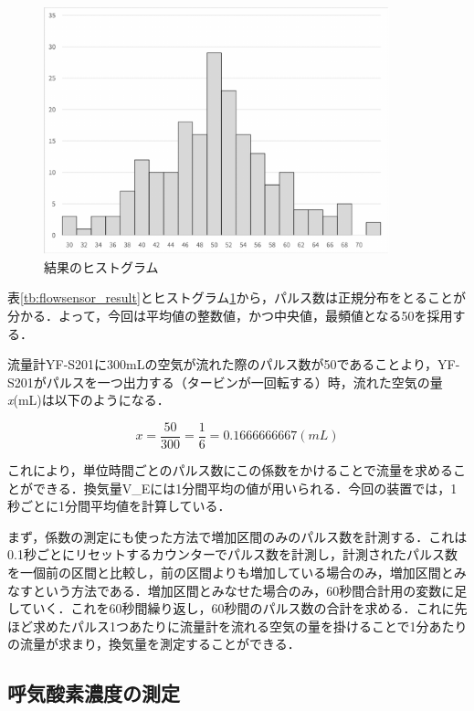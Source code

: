 \begin{figure}[H]
  \begin{center}
    \caption{結果のヒストグラム}
    \label{fig:flowsensor_histogram}
    \includegraphics[width=10cm]{fig/flowsensor_histogram}
  \end{center}
\end{figure}

表\ref{tb:flowsensor_result}とヒストグラム\ref{fig:flowsensor_histogram}から，パルス数は正規分布をとることが分かる．よって，今回は平均値の整数値，かつ中央値，最頻値となる50を採用する．

流量計YF-S201に300mLの空気が流れた際のパルス数が50であることより，YF-S201がパルスを一つ出力する（タービンが一回転する）時，流れた空気の量{\it x}(mL)は以下のようになる．

\begin{equation}
  \label{eq:pulse_per_ml}
  x = \frac{50}{300} = \frac{1}{6} = 0.1666666667 (mL)
\end{equation}

これにより，単位時間ごとのパルス数にこの係数をかけることで流量を求めることができる．換気量V_Eには1分間平均の値が用いられる．今回の装置では，1秒ごとに1分間平均値を計算している．

まず，係数の測定にも使った方法で増加区間のみのパルス数を計測する．これは0.1秒ごとにリセットするカウンターでパルス数を計測し，計測されたパルス数を一個前の区間と比較し，前の区間よりも増加している場合のみ，増加区間とみなすという方法である．増加区間とみなせた場合のみ，60秒間合計用の変数に足していく．これを60秒間繰り返し，60秒間のパルス数の合計を求める．これに先ほど求めたパルス1つあたりに流量計を流れる空気の量を掛けることで1分あたりの流量が求まり，換気量を測定することができる．

\subsection{呼気酸素濃度の測定}

